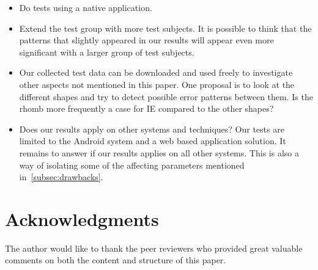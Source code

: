 \documentclass[runningheads,a4paper]{llncs}
\begin{document}
\begin{itemize}
	\item Do tests using a native application.
	\item Extend the test group with more test subjects. It is possible to think that the patterns that slightly appeared in our results will appear even more significant with a larger group of test subjects.
	\item Our collected test data can be downloaded and used freely to investigate other aspects not mentioned in this paper. One proposal is to look at the different shapes and try to detect possible error patterns between them. Is the rhomb more frequently a case for IE compared to the other shapes?
	\item Does our results apply on other systems and techniques? Our tests are limited to the Android system and a web based application solution. It remains to answer if our results applies on all other systems. This is also a way of isolating some of the affecting parameters mentioned in~\ref{subsec:drawbacks}.
\end{itemize}

\section{Acknowledgments}
The author would like to thank the peer reviewers who provided great valuable comments on both the content and structure of this paper.

%
% 
%
%

%


\end{document}
